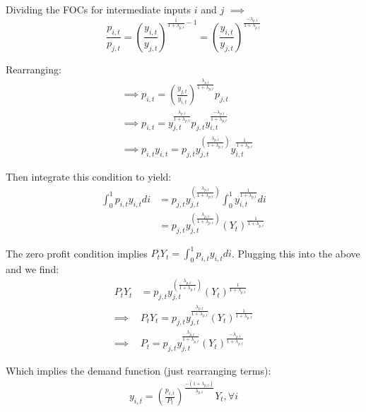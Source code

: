 Dividing the FOCs for intermediate inputs $i$ and $j$ $\implies$
\begin{equation}
\frac{p_{i,t}}{p_{j,t}} = \left(\frac{y_{i,t}}{y_{j,t}}\right)^{\frac{1}{1+\lambda_{p,t}}-1} = \left(\frac{y_{i,t}}{y_{j,t}}\right)^{\frac{-\lambda_{p,t}}{1+\lambda_{p,t}}}
\end{equation}

Rearranging:
\begin{equation}
\begin{split}
&\implies p_{i,t} = \left(\frac{y_{j,t}}{y_{i,t}}\right)^{\frac{\lambda_{p,t}}{1+\lambda_{p,t}}}p_{j,t} \\
& \implies p_{i,t} = y_{j,t}^{\frac{\lambda_{p,t}}{1+\lambda_{p,t}}}p_{j,t}y_{i,t}^{\frac{-\lambda_{p,t}}{1+\lambda_{p,t}}} \\
& \implies p_{i,t}y_{i,t} = p_{j,t}y_{j,t}^{\left(\frac{\lambda_{p,t}}{1+\lambda_{p,t}}\right)}y_{i,t}^{\frac{1}{1+\lambda_{p,t}}}
\end{split}
\end{equation}

Then integrate this condition to yield:
\begin{equation}
\begin{split}
\int_{0}^{1}p_{i,t}y_{i,t}di & = p_{j,t}y_{j,t}^{\left(\frac{\lambda_{p,t}}{1+\lambda_{p,t}}\right)}\int_{0}^{1}y_{i,t}^{\frac{1}{1+\lambda_{p,t}}}di  \\
& = p_{j,t}y_{j,t}^{\left(\frac{\lambda_{p,t}}{1+\lambda_{p,t}}\right)}(Y_{t})^{\frac{1}{1+\lambda_{p,t}}}
\end{split}
\end{equation}

The zero profit condition implies $P_{t}Y_{t}=\int_{0}^{1}p_{i,t}y_{i,t}di$.  Plugging this into the above and we find:
\begin{equation}
\begin{split}
P_{t}Y_{t} &= p_{j,t}y_{j,t}^{\left(\frac{\lambda_{p,t}}{1+\lambda_{p,t}}\right)}(Y_{t})^{\frac{1}{1+\lambda_{p,t}}} \\
\implies &P_{t}Y_{t}=p_{j,t}y_{j,t}^{\frac{\lambda_{p,t}}{1+\lambda_{p,t}}}(Y_{t})^{\frac{1}{1+\lambda_{p,t}}} \\
\implies & P_{t} =  p_{j,t}y_{j,t}^{\frac{\lambda_{p,t}}{1+\lambda_{p,t}}}(Y_{t})^{\frac{-\lambda_{p,t}}{1+\lambda_{p,t}}}
\end{split}
\end{equation}

Which implies the demand function (just rearranging terms):
\begin{equation}
\begin{split}
y_{i,t} =  \left(\frac{p_{i,t}}{P_{t}}\right)^{\frac{-(1+\lambda_{p,t})}{\lambda_{p,t}}}Y_{t}, \forall i
\end{split}
\end{equation}


